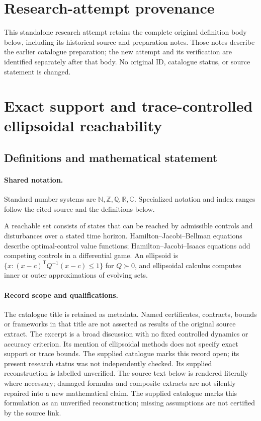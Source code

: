 \documentclass[11pt]{article}
\begin{document}
\section*{Research-attempt provenance}
This standalone research attempt retains the complete original definition body below,
including its historical source and preparation notes. Those notes describe the
earlier catalogue preparation; the new attempt and its verification are identified
separately after that body. No original ID, catalogue status, or source statement is changed.

\section{Exact support and trace-controlled ellipsoidal reachability}\label{statement}

\subsection{Definitions and mathematical statement}

\paragraph{Shared notation.}Standard number systems are $\mathbb N,\mathbb Z,\mathbb Q,\mathbb R,\mathbb C$. Specialized notation and index ranges follow the cited source and the definitions below.


A reachable set consists of states that can be reached by admissible controls and disturbances over a stated time horizon. Hamilton--Jacobi--Bellman equations describe optimal-control value functions; Hamilton--Jacobi--Isaacs equations add competing controls in a differential game. An ellipsoid is $\{x:(x-c)^{\mathsf T}Q^{-1}(x-c)\leq1\}$ for $Q\succ0$, and ellipsoidal calculus computes inner or outer approximations of evolving sets.
\paragraph{Record scope and qualifications.}
The catalogue title is retained as metadata. Named certificates, contracts, bounds or frameworks in that title are not asserted as results of the original source extract.
The excerpt is a broad discussion with no fixed controlled dynamics or accuracy criterion. Its mention of ellipsoidal methods does not specify exact support or trace bounds. The supplied catalogue marks this record open; its present research status was not independently checked. Its supplied reconstruction is labelled unverified.
The source text below is rendered literally where necessary; damaged formulas and composite extracts are not silently repaired into a new mathematical claim.
The supplied catalogue marks this formulation as an unverified reconstruction; missing assumptions are not certified by the source link.
\end{document}
